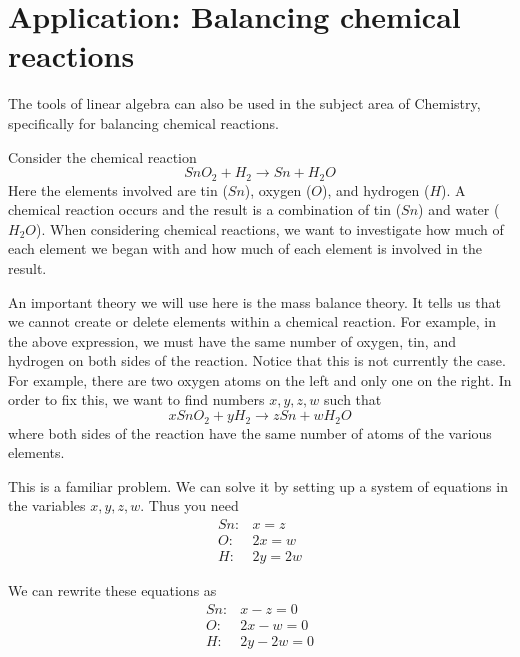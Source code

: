 \section{Application: Balancing chemical reactions}

The tools of linear algebra can also be used in the subject area of Chemistry, specifically for balancing chemical reactions. 

Consider the chemical reaction 
\begin{equation*}
SnO_{2}+H_{2}\rightarrow Sn+H_{2}O
\end{equation*}
Here the elements involved are tin ($Sn$), oxygen ($O$), and hydrogen ($H$). A
chemical reaction occurs and the result is a combination of tin ($Sn$) and water ($H_{2}O$). When considering
chemical reactions, we want to investigate how much of each element we began with and how much of each element is involved in the result.

An important theory we will use here is the mass balance theory. It tells us that we cannot create or delete 
elements within a chemical reaction. For example, in the above expression, we must have the same number of oxygen, tin,
and hydrogen on both sides of the reaction. Notice that this is not currently the case.
 For example, there are two oxygen atoms on the left and only one
on the right. In order to fix this, we want to find numbers $x,y,z,w$ such that 
\begin{equation*}
xSnO_{2}+yH_{2}\rightarrow zSn+wH_{2}O
\end{equation*}
where both sides of the reaction have the same number of atoms of the various elements. 

This is a familiar problem. We can solve it by setting up a system of equations 
in the variables $x,y,z,w$. Thus you need 
\begin{equation*}
\begin{array}{cl}
Sn: & x=z \\ 
O: & 2x=w \\ 
H: & 2y=2w
\end{array}
\end{equation*}

We can rewrite these equations as
\begin{equation*}
\begin{array}{cl}
Sn: & x - z = 0 \\ 
O: & 2x - w = 0 \\ 
H: & 2y - 2w = 0 
\end{array}
\end{equation*}

